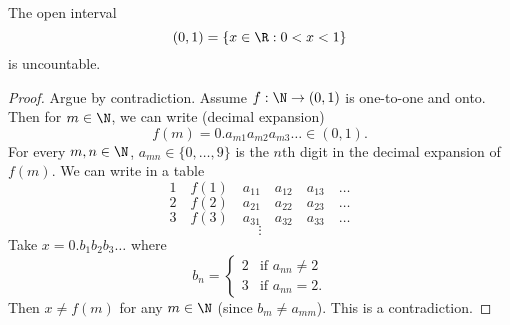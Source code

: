 \begin{theorem}
  The open interval
  \[(0, 1) = \{x \in \R : 0 < x < 1\}\]
  is uncountable.
\end{theorem}

\begin{proof}
  Argue by contradiction. Assume $f : \N \to (0, 1)$
  is one-to-one and onto. Then for $m \in \N$,
  we can write (decimal expansion)
  \[f(m) = 0.a_{m1}a_{m2}a_{m3}\ldots \in (0, 1).\]
  For every $m, n \in \N$, $a_{mn} \in \{0, \dots, 9\}$
  is the $n$th digit in the decimal expansion of
  $f(m)$. We can write in a table
  \[1 \quad f(1) \quad a_{11} \quad a_{12} \quad a_{13} \quad \dots\]
  \[2 \quad f(2) \quad a_{21} \quad a_{22} \quad a_{23} \quad \dots\]
  \[3 \quad f(3) \quad a_{31} \quad a_{32} \quad a_{33} \quad \dots\]
  \[\vdots\]
  Take $x = 0.b_1b_2b_3\ldots$ where
  \[
    b_n =
    \begin{cases}
      2 & \text{if $a_{nn} \ne 2$} \\
      3 & \text{if $a_{nn} = 2$}.
    \end{cases}
  \]
  Then $x \ne f(m)$ for any $m \in \N$
  (since $b_m \ne a_{mm}$). This is a
  contradiction.
\end{proof}
